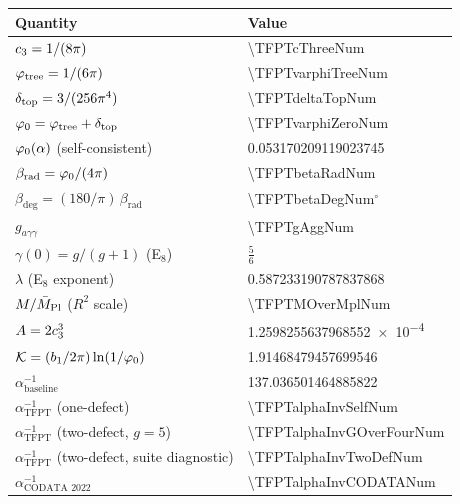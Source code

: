 \begin{table}[H]
\centering
\small
\begin{tabular}{@{}ll@{}}
\toprule
\textbf{Quantity} & \textbf{Value}\\
\midrule
$c_3 = 1/(8\pi)$ & \num[round-mode=places,round-precision=12]{\TFPTcThreeNum}\\
$\varphi_{\mathrm{tree}} = 1/(6\pi)$ & \num[round-mode=places,round-precision=12]{\TFPTvarphiTreeNum}\\
$\delta_{\mathrm{top}} = 3/(256\pi^4)$ & \num[round-mode=places,round-precision=12]{\TFPTdeltaTopNum}\\
$\varphi_0 = \varphi_{\mathrm{tree}} + \delta_{\mathrm{top}}$ & \num[round-mode=places,round-precision=12]{\TFPTvarphiZeroNum}\\
$\varphi_0(\alpha)$ (self-consistent) & \num[round-mode=places,round-precision=12]{0.053170209119023745}\\
$\beta_{\text{rad}} = \varphi_0/(4\pi)$ & \num[round-mode=places,round-precision=12]{\TFPTbetaRadNum}\\
$\beta_{\text{deg}} = (180/\pi)\,\beta_{\text{rad}}$ & \num[round-mode=places,round-precision=6]{\TFPTbetaDegNum}$^\circ$\\
$g_{a\gamma\gamma}$ & \num[round-mode=places,round-precision=12]{\TFPTgAggNum}\\
$\gamma(0)=g/(g+1)$ (E$_8$) & $\tfrac56$\\
$\lambda$ (E$_8$ exponent) & \num[round-mode=places,round-precision=12]{0.587233190787837868}\\
$M/\bar{M}_{\mathrm{Pl}}$ ($R^2$ scale) & \num[round-mode=places,round-precision=12]{\TFPTMOverMplNum}\\
$A = 2c_3^3$ & \num[round-mode=figures,round-precision=8]{1.2598255637968552e-4}\\
$\mathcal{K} = (b_1/2\pi)\ln(1/\varphi_0)$ & \num[round-mode=places,round-precision=10]{1.91468479457699546}\\
$\alpha^{-1}_{\text{baseline}}$ & \num[round-mode=places,round-precision=9]{137.036501464885822}\\
$\alpha^{-1}_{\text{TFPT}}$ (one-defect) & \num[round-mode=places,round-precision=12]{\TFPTalphaInvSelfNum}\\
$\alpha^{-1}_{\text{TFPT}}$ (two-defect, $g=5$) & \num[round-mode=places,round-precision=12]{\TFPTalphaInvGOverFourNum}\\
$\alpha^{-1}_{\text{TFPT}}$ (two-defect, suite diagnostic) & \num[round-mode=places,round-precision=12]{\TFPTalphaInvTwoDefNum}\\
$\alpha^{-1}_{\text{CODATA 2022}}$ & \num[round-mode=places,round-precision=9]{\TFPTalphaInvCODATANum}\\

\end{tabular}
\end{table}
